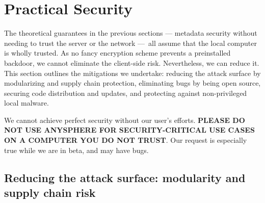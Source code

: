 \newpage
\section{Practical Security} \label{sec:practical-security}

The theoretical guarantees in the previous sections — metadata security without needing to trust the server or the network — all assume that the local computer is wholly trusted. As no fancy encryption scheme prevents a preinstalled backdoor, we cannot eliminate the client-side risk. Nevertheless, we can reduce it. This section outlines the mitigations we undertake: reducing the attack surface by modularizing and supply chain protection, eliminating bugs by being open source, securing code distribution and updates, and protecting against non-privileged local malware.

We cannot achieve perfect security without our user's efforts. \textbf{PLEASE DO NOT USE ANYSPHERE FOR SECURITY-CRITICAL USE CASES ON A COMPUTER YOU DO NOT TRUST}. Our request is especially true while we are in beta, and may have bugs.




\subsection{Reducing the attack surface: modularity and supply chain risk}

